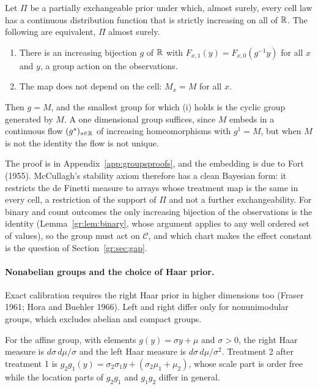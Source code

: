 \begin{proposition}\label{gr:prop:transport}
Let $\Pi$ be a partially exchangeable prior under which, almost surely, every cell law has a continuous distribution function that is strictly increasing on all of $\mathbb{R}$. The following are equivalent, $\Pi$ almost surely.
\begin{enumerate}
\item[(i)] There is an increasing bijection $g$ of $\mathbb{R}$ with $F_{x,1}(y)=F_{x,0}(g^{-1}y)$ for all $x$ and $y$, a group action on the observations.
\item[(ii)] The map does not depend on the cell: $M_x=M$ for all $x$.
\end{enumerate}
Then $g=M$, and the smallest group for which (i) holds is the cyclic group generated by $M$. A one dimensional group suffices, since $M$ embeds in a continuous flow $(g^{s})_{s\in\mathbb{R}}$ of increasing homeomorphisms with $g^{1}=M$, but when $M$ is not the identity the flow is not unique.
\end{proposition}

The proof is in Appendix~\ref{app:groupsproofs}, and the embedding is due to Fort (1955). McCullagh's stability axiom therefore has a clean Bayesian form: it restricts the de Finetti measure to arrays whose treatment map is the same in every cell, a restriction of the support of $\Pi$ and not a further exchangeability. For binary and count outcomes the only increasing bijection of the observations is the identity (Lemma~\ref{gr:lem:binary}, whose argument applies to any well ordered set of values), so the group must act on $\mathcal C$, and which chart makes the effect constant is the question of Section~\ref{gr:sec:gap}.

\paragraph{Nonabelian groups and the choice of Haar prior.} Exact calibration requires the right Haar prior in higher dimensions too (Fraser 1961; Hora and Buehler 1966). Left and right differ only for nonunimodular groups, which excludes abelian and compact groups.

\begin{proposition}\label{gr:prop:affine}
For the affine group, with elements $g(y)=\sigma y+\mu$ and $\sigma>0$, the right Haar measure is $d\sigma\,d\mu/\sigma$ and the left Haar measure is $d\sigma\,d\mu/\sigma^{2}$. Treatment 2 after treatment 1 is $g_2g_1(y)=\sigma_2\sigma_1y+(\sigma_2\mu_1+\mu_2)$, whose scale part is order free while the location parts of $g_2g_1$ and $g_1g_2$ differ in general.
\end{proposition}

